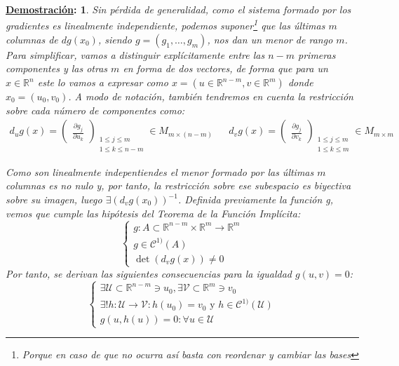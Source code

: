 \documentclass[10pt,a4paper,openright]{book}
\theoremstyle{break}
\newtheorem*{demo}{\underline{Demostración}:}
\begin{document}
\begin{demo}
Sin pérdida de generalidad, como el sistema formado por los gradientes es linealmente independiente, podemos suponer\footnote{Porque en caso de que no ocurra así basta con reordenar y cambiar las bases} que las últimas $m$ columnas de $dg(x_0)$, siendo $g = (g_1, \ldots, g_m)$, nos dan un menor de rango $m$. Para simplificar, vamos a distinguir explícitamente entre las $n-m$ primeras componentes y las otras $m$ en forma de dos vectores, de forma que  para un $x \in \mathbb{R}^n$ este lo vamos a expresar como $x = (u \in \mathbb{R}^{n-m}, v\in \mathbb{R}^m)$ donde $x_0 = (u_0,v_0)$. A modo de notación, también tendremos en cuenta la restricción sobre cada número de componentes como:
\begin{align*}
d_u g(x) = \begin{pmatrix}
\frac{\partial g_j}{\partial u_k}
\end{pmatrix}_{\substack{1 \leq j \leq m \\ 1 \leq k \leq n - m}} \in M_{m \times (n-m)} & & d_v g(x) = \begin{pmatrix}
\frac{\partial g_j}{\partial v_k}
\end{pmatrix}_{\substack{1 \leq j \leq m \\ 1 \leq k \leq m}}  \in M_{m \times m}
\end{align*}

Como son linealmente indepentiendes el menor formado por las últimas $m$ columnas es no nulo y, por tanto, la restricción sobre ese subespacio es biyectiva sobre su imagen, luego $\exists (d_vg(x_0))^{-1}$. Definida previamente la función g, vemos que cumple las hipótesis del Teorema de la Función Implícita:
$$\begin{cases}
g : A \subset \mathbb{R}^{n-m} \times \mathbb{R}^m \to \mathbb{R}^m \\
g \in \mathcal{C}^{1)}(A) \\
\det\left(d_vg(x)\right) \neq 0
\end{cases}$$
Por tanto, se derivan las siguientes consecuencias para la igualdad $g(u,v) =0$:
$$\begin{cases}
\exists \mathcal{U} \subset \mathbb{R}^{n-m} \ni u_0, \exists \mathcal{V} \subset \mathbb{R}^m \ni v_0 \\
\exists ! h : \mathcal{U} \to \mathcal{V} : h(u_0) = v_0 \text{ y } h \in \mathcal{C}^{1)} (\mathcal{U}) \\
g(u, h(u)) = 0 : \forall u \in \mathcal{U}
\end{cases}$$


\end{demo}
\end{document}
